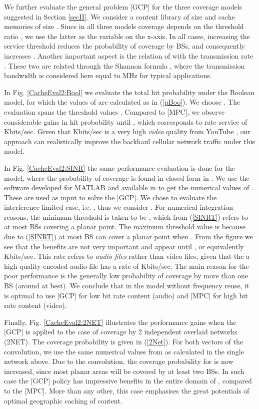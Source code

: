 \documentclass[conference,twocolum,final]{IEEEtran}
\begin{document}
{We further evaluate the general problem [GCP] for the three coverage models suggested in Section \ref{secII}. We consider a content library of size  and cache memories of size . Since in all three models coverage depends on the threshold ratio , we use the latter as the variable on the x-axis. In all cases, increasing the service threshold  reduces the probability of coverage by  BSs, and consequently increases . Another important aspect is the relation of  with the transmission rate . These two are related through the Shannon formula 
,
where the transmission bandwidth is considered here equal to  MHz for typical applications.

In Fig. \ref{CacheEval2:Bool} we evaluate the total hit probability under the Boolean model, for which the values of  are calculated as in (\ref{pBoo}). We choose . The evaluation spans the threshold values . Compared to [MPC], we observe considerable gains in hit probability until , which corresponds to rate service of  Kbits/sec. Given that  Kbits/sec is a very high \textit{video} quality from YouTube \cite{YouTubeEncode}, our approach can realistically improve the backhaul cellular network  traffic under this model.


In Fig. \ref{CacheEval2:SINR} the same performance evaluation is done for the  model, where the probability of coverage is found in closed form in \cite{KeelerBartek13}. We use the software developed for MATLAB and available in \cite{KeelerMATLABk} to get the numerical values of . These are used as input to solve the [GCP]. We chose to evaluate the interference-limited case, i.e. , thus we consider . For numerical integration reasons, the minimum threshold is taken to be , which from (\ref{SINRT}) refers to at most  BSs covering a planar point. The maximum threshold value is  because due to (\ref{SINRT}) at most  BS can cover a planar point when . From the figure we see that the benefits are not very important and appear until , or equivalently  Kbits/sec. This rate refers to \textit{audio files} rather than video files, given that the a high quality encoded audio file has a rate of  Kbits/sec. The main reason for the poor performance is the generally low probability of coverage by more than one BS (around  at best). We conclude that in the  model without frequency reuse, it is optimal to use [GCP] for low bit rate content (audio) and [MPC] for high bit rate content (video).

Finally, Fig. \ref{CacheEval2:2NET} illustrates the performance gains when the [GCP] is applied to the case of coverage by 2 independent overlaid networks (2NET). The coverage probability  is given in (\ref{2Net}). 
For both vectors of the convolution, we use the same numerical values from  as calculated in the single  network above. Due to the convolution, the coverage probability for  is now increased, since most planar areas will be covered by at least two BSs. In such case the [GCP] policy has impressive benefits in the entire domain of , compared to the [MPC]. More than any other, this case emphasises the great potentials of optimal geographic caching of content.



}
\end{document}
